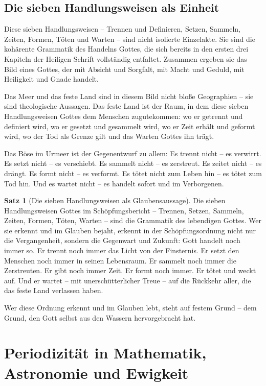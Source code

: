 ﻿\documentclass[a4paper,12pt]{article}
\theoremstyle{definition}
\newtheorem{theorem}{Satz}[section]
\begin{document}
\subsection{Die sieben Handlungsweisen als Einheit}

Diese sieben Handlungsweisen -- Trennen und Definieren, Setzen, Sammeln, Zeiten,
Formen, Töten und Warten -- sind nicht isolierte Einzelakte. Sie sind die
kohärente Grammatik des Handelns Gottes, die sich bereits in den ersten drei
Kapiteln der Heiligen Schrift vollständig entfaltet. Zusammen ergeben sie das
Bild eines Gottes, der mit Absicht und Sorgfalt, mit Macht und Geduld, mit Heiligkeit
und Gnade handelt.

Das Meer und das feste Land sind in diesem Bild nicht bloße Geographien -- sie
sind theologische Aussagen. Das feste Land ist der Raum, in dem diese sieben
Handlungsweisen Gottes dem Menschen zugutekommen: wo er getrennt und definiert
wird, wo er gesetzt und gesammelt wird, wo er Zeit erhält und geformt wird, wo
der Tod als Grenze gilt und das Warten Gottes ihn trägt.

Das Böse im Urmeer ist der Gegenentwurf zu allem: Es trennt nicht -- es verwirrt.
Es setzt nicht -- es verschiebt. Es sammelt nicht -- es zerstreut. Es zeitet nicht
-- es drängt. Es formt nicht -- es verformt. Es tötet nicht zum Leben hin --
es tötet zum Tod hin. Und es wartet nicht -- es handelt sofort und im Verborgenen.

\begin{theorem}[Die sieben Handlungsweisen als Glaubensaussage]
	Die sieben Handlungsweisen Gottes im Schöpfungsbericht -- Trennen, Setzen,
	Sammeln, Zeiten, Formen, Töten, Warten -- sind die Grammatik des lebendigen
	Gottes. Wer sie erkennt und im Glauben bejaht, erkennt in der Schöpfungsordnung
	nicht nur die Vergangenheit, sondern die Gegenwart und Zukunft: Gott handelt
	noch immer so. Er trennt noch immer das Licht von der Finsternis. Er setzt den
	Menschen noch immer in seinen Lebensraum. Er sammelt noch immer die Zerstreuten.
	Er gibt noch immer Zeit. Er formt noch immer. Er tötet und weckt auf. Und er
	wartet -- mit unerschütterlicher Treue -- auf die Rückkehr aller, die das feste
	Land verlassen haben.
\end{theorem}

Wer diese Ordnung erkennt und im Glauben lebt, steht auf festem Grund --
dem Grund, den Gott selbst aus den Wassern hervorgebracht hat.


\section{Periodizität in Mathematik, Astronomie und Ewigkeit}
\end{document}
